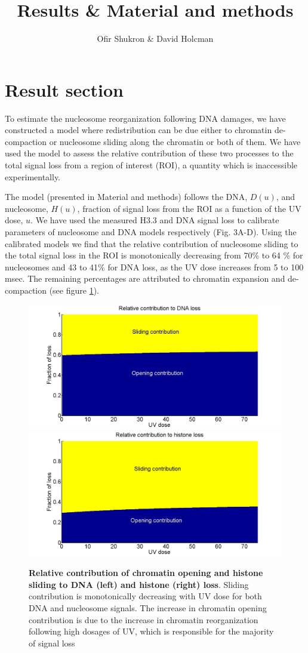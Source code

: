 \documentclass[12pt]{article}
\begin{document}
	
\title{Results \& Material and methods}
\author{Ofir Shukron \& David Holcman}
\maketitle

\section{Result section}

To estimate the nucleosome reorganization following DNA damages, we have constructed a model where redistribution can be due either to chromatin de-compaction or nucleosome sliding along the chromatin or both of them. We have used the model to assess the relative contribution of these two processes to the total signal loss from a region of interest (ROI), a quantity which is inaccessible experimentally. 

The model (presented in Material and methods) follows the DNA, $D(u)$, and nucleosome, $H(u)$, fraction of signal loss from the ROI as a function of the UV dose, $u$. We have used the measured H3.3 and DNA signal loss to calibrate parameters of nucleosome and DNA models respectively (Fig. 3A-D). Using the calibrated models we find that the relative contribution of nucleosome sliding to the total signal loss in the ROI is monotonically decreasing from 70\% to 64 \% for nucleosomes and 43 to 41\% for DNA loss, as the UV dose increases from 5 to 100 msec. The remaining percentages are attributed to chromatin expansion and de-compaction (see figure \ref{fig:relatiiveContributionToLoss}).

\begin{figure}[H]
	\includegraphics[width=0.5\linewidth, height=0.3\textheight]{relatiiveContributionToDNALoss}
	\includegraphics[width=0.5\linewidth, height=0.3\textheight]{relativeContributionToHistoneLoss}
	\caption{\textbf{Relative contribution of chromatin opening and histone sliding to DNA (left) and histone (right) loss}. Sliding contribution is monotonically decreasing with UV dose for both DNA and nucleosome signals. The increase in chromatin opening contribution is due to the increase in chromatin reorganization following high dosages of UV, which is responsible for the majority of signal loss}
	\label{fig:relatiiveContributionToLoss}
\end{figure}
\end{document}
